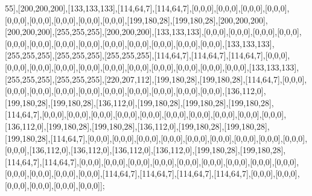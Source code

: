 55],[200,200,200],[133,133,133],[114,64,7],[114,64,7],[0,0,0],[0,0,0],[0,0,0],[0,0,0],[0,0,0],[0,0,0],[0,0,0],[0,0,0],[0,0,0],[199,180,28],[199,180,28],[200,200,200],[200,200,200],[255,255,255],[200,200,200],[133,133,133],[0,0,0],[0,0,0],[0,0,0],[0,0,0],[0,0,0],[0,0,0],[0,0,0],[0,0,0],[0,0,0],[0,0,0],[0,0,0],[0,0,0],[0,0,0],[133,133,133],[255,255,255],[255,255,255],[255,255,255],[114,64,7],[114,64,7],[114,64,7],[0,0,0],[0,0,0],[0,0,0],[0,0,0],[0,0,0],[0,0,0],[0,0,0],[0,0,0],[0,0,0],[0,0,0],[0,0,0],[133,133,133],[255,255,255],[255,255,255],[220,207,112],[199,180,28],[199,180,28],[114,64,7],[0,0,0],[0,0,0],[0,0,0],[0,0,0],[0,0,0],[0,0,0],[0,0,0],[0,0,0],[0,0,0],[0,0,0],[136,112,0],[199,180,28],[199,180,28],[136,112,0],[199,180,28],[199,180,28],[199,180,28],[114,64,7],[0,0,0],[0,0,0],[0,0,0],[0,0,0],[0,0,0],[0,0,0],[0,0,0],[0,0,0],[0,0,0],[0,0,0],[136,112,0],[199,180,28],[199,180,28],[136,112,0],[199,180,28],[199,180,28],[199,180,28],[114,64,7],[0,0,0],[0,0,0],[0,0,0],[0,0,0],[0,0,0],[0,0,0],[0,0,0],[0,0,0],[0,0,0],[0,0,0],[136,112,0],[136,112,0],[136,112,0],[136,112,0],[199,180,28],[199,180,28],[114,64,7],[114,64,7],[0,0,0],[0,0,0],[0,0,0],[0,0,0],[0,0,0],[0,0,0],[0,0,0],[0,0,0],[0,0,0],[0,0,0],[0,0,0],[0,0,0],[0,0,0],[114,64,7],[114,64,7],[114,64,7],[114,64,7],[0,0,0],[0,0,0],[0,0,0],[0,0,0],[0,0,0],[0,0,0]];

